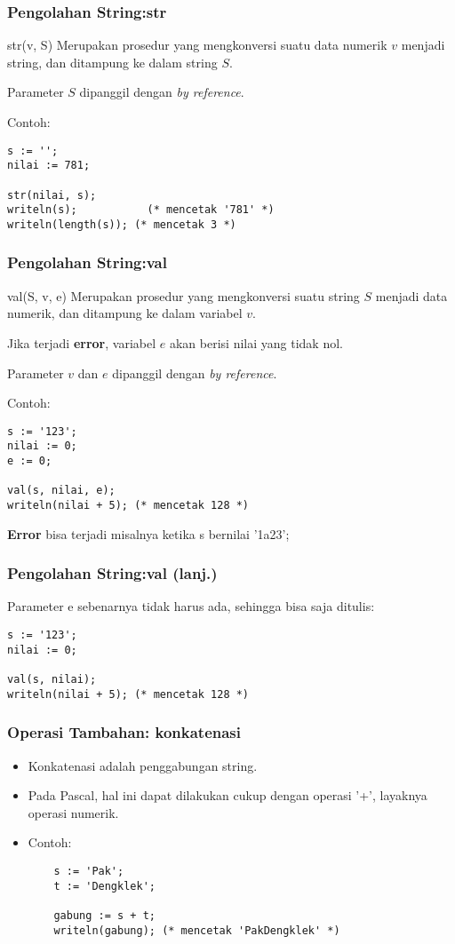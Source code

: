\documentclass{beamer}
\begin{document}
\begin{frame}[fragile]
\frametitle{Pengolahan String:\newline str}
\begin{block}{str(v, S)}
Merupakan prosedur yang mengkonversi suatu data numerik $v$ menjadi string, dan ditampung ke dalam string $S$.

Parameter $S$ dipanggil dengan \textit{by reference}.
\end{block}
Contoh:
\begin{lstlisting}
s := '';
nilai := 781;

str(nilai, s);
writeln(s);           (* mencetak '781' *)
writeln(length(s)); (* mencetak 3 *)
\end{lstlisting}
\end{frame}

\begin{frame}[fragile]
\frametitle{Pengolahan String:\newline val}
\begin{block}{val(S, v, e)}
Merupakan prosedur yang mengkonversi suatu string $S$ menjadi data numerik, dan ditampung ke dalam variabel $v$.

Jika terjadi \textbf{error}, variabel $e$ akan berisi nilai yang tidak nol.

Parameter $v$ dan $e$ dipanggil dengan \textit{by reference}.
\end{block}
Contoh:
\begin{lstlisting}
s := '123';
nilai := 0;
e := 0;

val(s, nilai, e);
writeln(nilai + 5); (* mencetak 128 *)
\end{lstlisting}

\textbf{Error} bisa terjadi misalnya ketika s bernilai '1a23';
\end{frame}

\begin{frame}[fragile]
\frametitle{Pengolahan String:\newline val (lanj.)}
Parameter e sebenarnya tidak harus ada, sehingga bisa saja ditulis:
\begin{lstlisting}
s := '123';
nilai := 0;

val(s, nilai);
writeln(nilai + 5); (* mencetak 128 *)
\end{lstlisting}
\end{frame}

\begin{frame}[fragile]
\frametitle{Operasi Tambahan: konkatenasi}
\begin{itemize}
    \item Konkatenasi adalah penggabungan string.
    \item Pada Pascal, hal ini dapat dilakukan cukup dengan operasi '+', layaknya operasi numerik.
    \item Contoh:
    \begin{lstlisting}
    s := 'Pak';
    t := 'Dengklek';

    gabung := s + t;
    writeln(gabung); (* mencetak 'PakDengklek' *)
    \end{lstlisting}
\end{itemize}
\end{frame}
\end{document}
